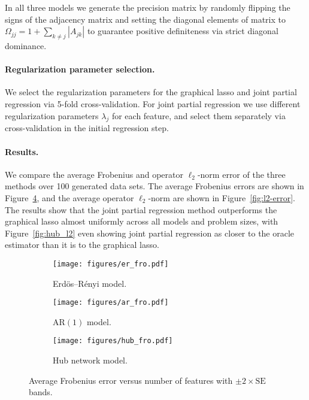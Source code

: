 \documentclass{article}
\begin{document}
In all three models we generate the precision matrix by randomly flipping the
signs of the adjacency matrix and setting the diagonal elements of matrix to
$\Omega_{jj} = 1 + \sum_{k\neq j}|A_{jk}|$ to guarantee positive definiteness
via strict diagonal dominance. 

\paragraph{Regularization parameter selection.} We select the regularization
parameters for the graphical lasso and joint partial regression via 5-fold
cross-validation. For joint partial regression we use different regularization
parameters $\lambda_j$ for each feature, and select them separately via
cross-validation in the initial regression step.

\paragraph{Results.} We compare the average Frobenius and operator $\ell_2$-norm
error of the three methods over 100 generated data sets. The average Frobenius
errors are shown in Figure~\ref{fig:fro-error}, and the average operator
$\ell_2$-norm are shown in Figure~\ref{fig:l2-error}. The results show that the
joint partial regression method outperforms the graphical lasso almost uniformly
across all models and problem sizes, with Figure~\ref{fig:hub_l2} even showing
joint partial regression as closer to the oracle estimator than it is to the
graphical lasso. 

\begin{figure}[ht]
    \centering
    \begin{subfigure}[t]{0.3\linewidth}
        \centering
        \texttt{[image: figures/er\_fro.pdf]}
        \caption{Erdös--Rényi model.}
        \label{fig:er_fro}
    \end{subfigure}
    \begin{subfigure}[t]{0.3\linewidth}
        \centering
        \texttt{[image: figures/ar\_fro.pdf]}
        \caption{$\text{AR}(1)$ model.}
        \label{fig:ar_fro}
    \end{subfigure}
    \begin{subfigure}[t]{0.3\linewidth}
        \centering
        \texttt{[image: figures/hub\_fro.pdf]}
        \caption{Hub network model.}
        \label{fig:hub_fro}
    \end{subfigure}
    \caption{Average Frobenius error versus number of features with $\pm 2
    \times \text{SE}$ bands.}
    \label{fig:fro-error}
\end{figure}
\end{document}
